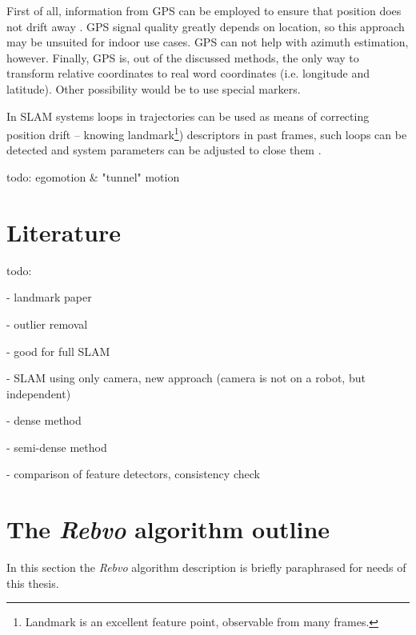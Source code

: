 
First of all, information from GPS can be employed to ensure that position does not drift away \cite{accurate_global_localization}. GPS signal quality greatly depends on location, so this approach may be unsuited for indoor use cases. GPS can not help with azimuth estimation, however. Finally, GPS is, out of the discussed methods, the only way to transform relative coordinates to real word coordinates (i.e. longitude and latitude). Other possibility would be to use special markers.

In SLAM systems loops in trajectories can be used as means of correcting position drift -- knowing landmark\footnote{Landmark is an excellent feature point, observable from many frames.}) descriptors in past frames, such loops can be detected and system parameters can be adjusted to close them \cite{the_application_of_kalman} \cite{monoslam}.


todo: egomotion \& "tunnel" motion
\cite{vehicle_egomotion} \cite{recovery_of_egomotion}




\section{Literature}

todo:

\cite{visual_odometry} - landmark paper

\cite{fast_monocular} - outlier removal

\cite{spatiotemporal} - good for full SLAM

\cite{a_kalman}

\cite{monoslam} - SLAM using only camera, new approach (camera is not on a robot, but independent)

\cite{mouragnon2006real}

\cite{robust_visual_odometry_estimation} - dense method

\cite{semi_dense} - semi-dense method

\cite{a_stereo_visual} - comparison of feature detectors, consistency check


\section{The \textit{Rebvo} algorithm outline}

In this section the \textit{Rebvo} algorithm \cite{jose2015realtime} description is briefly paraphrased for needs of this thesis.

